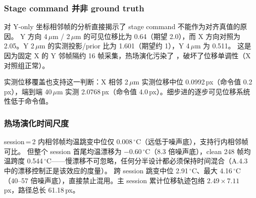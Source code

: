 \subsubsection{Stage command 并非 ground truth}

对 Y-only 坐标相邻帧的分析直接揭示了 stage command 不能作为对齐真值的原因。
Y 方向 4\,\(\mu\)m / 2\,\(\mu\)m 的可见位移比为 0.64（期望 2.0），而 X 方向对照为 2.05。Y 2\,\(\mu\)m 的实测投影/prior 比为 1.601（期望约 1），Y 4\,\(\mu\)m 为 0.511。
这是因为固定 X 的 Y 邻帧隔约 16 帧采集，热场演化污染了 ，破坏了位移单调性（X 对照组正常）。

实测位移覆盖也支持这一判断：X 相邻 2\,\(\mu\)m 实测位移中位 0.0992\,px（命令值 0.2\,px），端到端 40\,\(\mu\)m 实测 2.0768\,px（命令值 4.0\,px）。细步进的逐步可见位移系统性低于命令值。

\subsubsection{热场演化时间尺度}

session\,=\,2 内相邻帧均温跳变中位仅 0.008\,\(^\circ\)C（远低于噪声底），支持行内相邻帧可比。
但整个 session 首尾均温漂移为 \(-0.60\)\,\(^\circ\)C（8.3 倍噪声底），clean 248 帧均温跨度 0.544\,\(^\circ\)C——慢漂移不可忽略，任何分半设计都必须保持时间混合（A.4.3 中的漂移控制正是该效应的度量）。
跨 session 跳变中位 2.91\,\(^\circ\)C、最大 4.16\,\(^\circ\)C（40--57 倍噪声底），直接禁止混用。主 session 累计位移轨迹包络 \(2.49 \times 7.11\)\,px，路径总长 61.18\,px。
